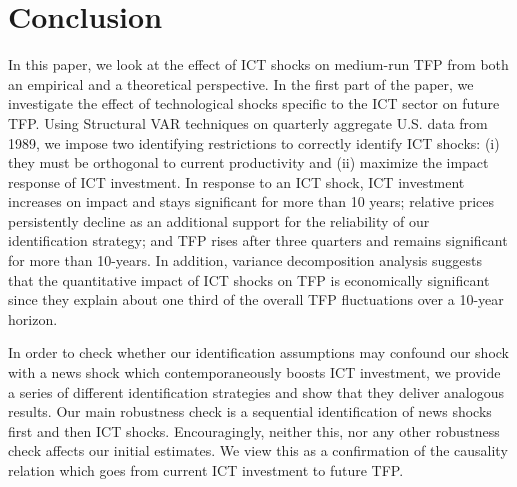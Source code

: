 \documentclass[12pt]{article}
\begin{document}



\section{Conclusion}\label{section:conclusions}


In this paper, we look at the effect of ICT shocks on medium-run TFP from both an empirical and a theoretical perspective. In the first part of the paper, we investigate the effect of technological shocks specific to the ICT sector on future TFP. Using Structural VAR techniques on quarterly aggregate U.S. data from 1989, we impose two identifying restrictions to correctly identify ICT shocks: (i) they must be orthogonal to current productivity and (ii) maximize the impact response of ICT investment. In response to an ICT shock, ICT investment increases on impact and stays significant for more than 10 years; relative prices persistently decline as an additional support for the reliability of our identification strategy; and TFP rises after three quarters and remains significant for more than 10-years. In addition, variance decomposition analysis suggests that the quantitative impact of ICT shocks on TFP is economically significant since they explain about one third of the overall TFP fluctuations over a 10-year horizon. 

In order to check whether our identification assumptions may confound our shock with a news shock which contemporaneously boosts ICT investment, we provide a series of different identification strategies and show that they deliver analogous results. Our main robustness check is a sequential identification of news shocks first and then ICT shocks. Encouragingly, neither this, nor any other robustness check affects our initial estimates. We view this as a confirmation of the causality relation which goes from current ICT investment to future TFP. 
\end{document}
